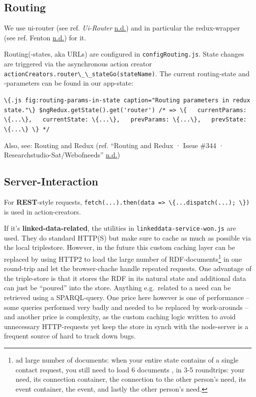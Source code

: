 \documentclass[a4paper,,tablecaptionabove]{scrbook}
\newcommand{\passthrough}[1]{#1}
\begin{document}
\hypertarget{sec:routing}{%
\subsection{Routing}\label{sec:routing}}

We use ui-router (see ref. \emph{Ui-Router}
\protect\hyperlink{ref-uirouter}{n.d.}) and in particular the
redux-wrapper (see ref. Fenton
\protect\hyperlink{ref-FentonreduxuirouterngReduxbindings}{n.d.}) for
it.

Routing(-states, aka URLs) are configured in
\passthrough{\lstinline!configRouting.js!}. State changes are triggered
via the asynchronous action creator
\passthrough{\lstinline!actionCreators.router\_\_stateGo(stateName)!}.
The current routing-state and -parameters can be found in our app-state:

\passthrough{\lstinline!\{.js fig:routing-params-in-state caption="Routing parameters in redux state."\} $ngRedux.getState().get('router') /* => \{   currentParams: \{...\},   currentState: \{...\},   prevParams: \{...\},   prevState: \{...\} \} */!}

Also, see: Routing and Redux (ref. ``Routing and Redux · Issue \#344 ·
Researchstudio-Sat/Webofneeds''
\protect\hyperlink{ref-RoutingReduxIssue}{n.d.})

\hypertarget{sec:server-interaction}{%
\subsection{Server-Interaction}\label{sec:server-interaction}}

For \textbf{REST}-style requests,
\passthrough{\lstinline!fetch(...).then(data => \{...dispatch(...); \})!}
is used in action-creators.

If it's \textbf{linked-data-related}, the utilities in
\passthrough{\lstinline!linkeddata-service-won.js!} are used. They do
standard HTTP(S) but make sure to cache as much as possible via the
local triplestore. However, in the future this custom caching layer can
be replaced by using HTTP2 to load the large number of
RDF-documents\footnote{ad large number of documents: when your entire
  state contains of a single contact request, you still need to load 6
  documents , in 3-5 roundtrips: your need, its connection container,
  the connection to the other person's need, its event container, the
  event, and lastly the other person's need.} in one round-trip and let
the browser-chache handle repeated requests. One advantage of the
triple-store is that it stores the RDF in its natural state and
additional data can just be \enquote{poured} into the store. Anything
e.g.~related to a need can be retrieved using a SPARQL-query. One price
here however is one of performance -- some queries performed very badly
and needed to be replaced by work-arounds -- and another price is
complexity, as the custom caching logic written to avoid unnecessary
HTTP-requests yet keep the store in synch with the node-server is a
frequent source of hard to track down bugs.
\end{document}
